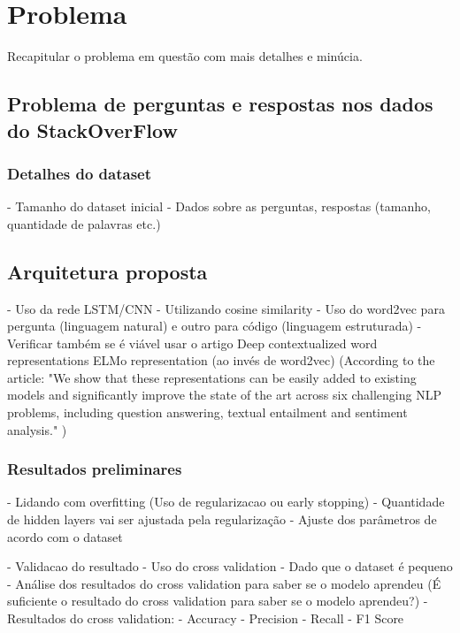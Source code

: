 \chapter{Problema}
\label{cap:problema}

Recapitular o problema em questão com mais detalhes e minúcia.

\section{Problema de perguntas e respostas nos dados do StackOverFlow} 

\subsection{Detalhes do dataset}

 - Tamanho do dataset inicial
 - Dados sobre as perguntas, respostas (tamanho, quantidade de palavras etc.)

\section{Arquitetura proposta} 

- Uso da rede LSTM/CNN 
       - Utilizando cosine similarity
       - Uso do word2vec para pergunta (linguagem natural) e outro para código (linguagem estruturada) - Verificar também se é viável usar o artigo Deep contextualized word representations ELMo representation (ao invés de word2vec) (According to the article: "We show that
these representations can be easily added to
existing models and significantly improve the
state of the art across six challenging NLP
problems, including question answering, textual entailment and sentiment analysis." )

\subsection{Resultados preliminares}

 - Lidando com overfitting (Uso de regularizacao ou early stopping) - Quantidade de hidden layers vai ser ajustada pela regularização
         - Ajuste dos parâmetros de acordo com o dataset
      
          - Validacao do resultado 
             - Uso do cross validation - Dado que o dataset é pequeno
             - Análise dos resultados do cross validation para saber se o modelo aprendeu (É suficiente o resultado do cross validation para saber se o modelo aprendeu?)
              - Resultados do cross validation:
                  - Accuracy
                  - Precision
                  - Recall
                  - F1 Score

